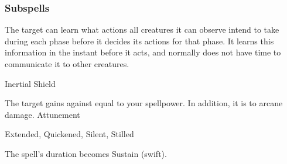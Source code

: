 \subsubsection{Subspells}
The target can learn what actions all creatures it can observe intend to take during each phase before it decides its actions for that phase.
It learns this information in the instant before it acts, and normally does not have time to communicate it to other creatures.
\begin{spellsection}{Inertial Shield}
\begin{spellheader}
\end{spellheader}
\begin{spellcontent}
\begin{spelltargetinginfo}
\end{spelltargetinginfo}
\begin{spelleffects}
\spelleffect
The target gains  against  equal to your spellpower.
In addition, it is  to arcane damage.
\spelldur Attunement
\end{spelleffects}
\end{spellcontent}
\begin{spellfooter}
 Extended, Quickened, Silent, Stilled
\end{spellfooter}
\begin{spellsubcontent}
\begin{spellcantrip}
The spell's duration becomes Sustain (swift).
\end{spellcantrip}
\end{spellsubcontent}
\end{spellsection}
